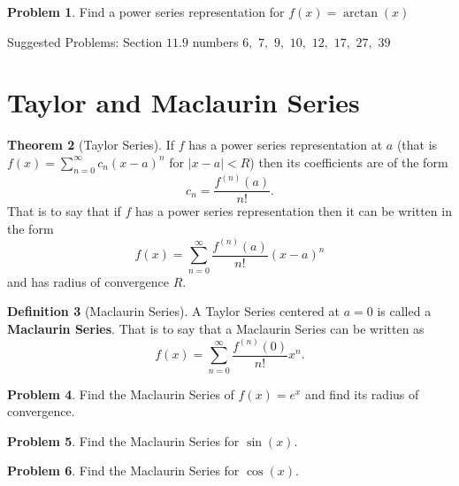 \documentclass[letterpaper, twoside, 12pt]{book}
\theoremstyle{definition}
\newtheorem{theorem}{Theorem}
\theoremstyle{definition}
\newtheorem{definition}[theorem]{Definition}
\newtheorem{problem}[theorem]{Problem}
\begin{document}
\vfill

\begin{problem}
 Find a power series representation for $f(x) = \arctan\left(x\right)$
\end{problem}

\vfill

\noindent Suggested Problems: Section $11.9$ numbers $6,$ $7,$ $9,$ $10,$ $12,$ $17,$ $27,$ $39$

\newpage

\section{Taylor and Maclaurin Series}

\begin{theorem}[Taylor Series]
 If $f$ has a power series representation at $a$ (that is
 $f(x) = \sum_{n=0}^{\infty} c_n \left(x-a\right)^n$ for $\left|x-a\right| <R$)
 then its coefficients are of the form
 $$c_n = \frac{f^{\left(n\right)}\left(a\right)}{n!}.$$
 That is to say that if $f$ has a power series representation then it can be
 written in the form
 $$f(x) = \sum_{n=0}^{\infty} \frac{f^{\left(n\right)}\left(a\right)}{n!} \left(x-a\right)^n$$
 and has radius of convergence $R$.
\end{theorem}

\begin{definition}[Maclaurin Series]
 A Taylor Series centered at $a=0$ is called a \textbf{Maclaurin Series}.  That is to say that a Maclaurin Series can be written as $$f(x) = \sum_{n=0}^{\infty} \frac{f^{\left(n\right)}\left(0\right)}{n!}x^n.$$
\end{definition}

\begin{problem}
 Find the Maclaurin Series of $f(x) = e^x$ and find its radius of convergence.
\end{problem}

\vfill

\newpage

\begin{problem}
 Find the Maclaurin Series for $\sin\left(x\right)$.
\end{problem}

\vfill

\begin{problem}
 Find the Maclaurin Series for $\cos\left(x\right)$.
\end{problem}

\vfill
\end{document}
